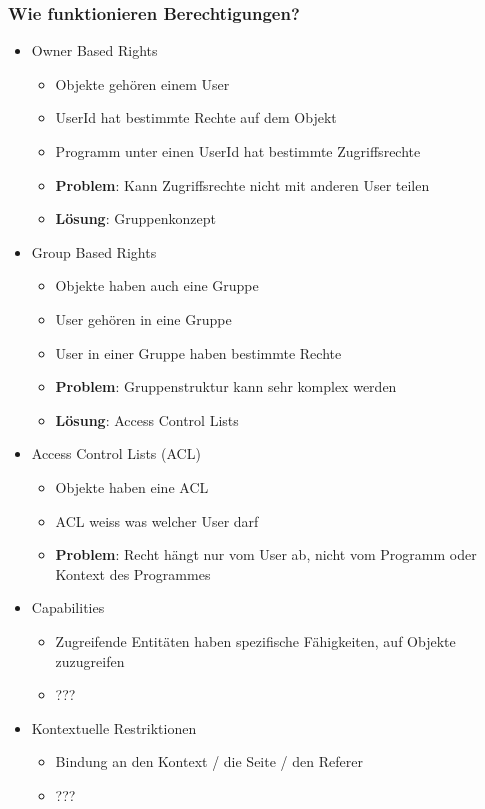 \documentclass{article} %
\begin{document}
	\subsubsection{Wie funktionieren Berechtigungen?}
	\begin{itemize}
		\item Owner Based Rights
		\begin{itemize}
			\item Objekte gehören einem User
			\item UserId hat bestimmte Rechte auf dem Objekt
			\item Programm unter einen UserId hat bestimmte Zugriffsrechte
			\item \textbf{Problem}: Kann Zugriffsrechte nicht mit anderen User teilen
			\item \textbf{Lösung}: Gruppenkonzept
		\end{itemize}
		\item Group Based Rights
		\begin{itemize}
			\item Objekte haben auch eine Gruppe
			\item User gehören in eine Gruppe
			\item User in einer Gruppe haben bestimmte Rechte
			\item \textbf{Problem}: Gruppenstruktur kann sehr komplex werden
			\item \textbf{Lösung}: Access Control Lists
		\end{itemize}
		\item Access Control Lists (ACL)
		\begin{itemize}
			\item Objekte haben eine ACL
			\item ACL weiss was welcher User darf
			\item \textbf{Problem}: Recht hängt nur vom User ab, nicht vom Programm oder Kontext des Programmes	
		\end{itemize}
		\item Capabilities
		\begin{itemize}
			\item Zugreifende Entitäten haben spezifische Fähigkeiten, auf Objekte zuzugreifen
			\item ???
		\end{itemize}
		\item Kontextuelle Restriktionen
		\begin{itemize}
			\item Bindung an den Kontext / die Seite / den Referer
			\item ???
		\end{itemize}
	\end{itemize}
\end{document}
